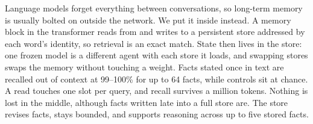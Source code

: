 \noindent Language models forget everything between conversations, so long-term memory is
usually bolted on outside the network. We put it inside instead. A memory block in the
transformer reads from and writes to a persistent store addressed by each word's identity,
so retrieval is an exact match. State then lives in the store: one frozen model is a
different agent with each store it loads, and swapping stores swaps the memory without
touching a weight. Facts stated once in text are recalled out of context at 99--100\% for
up to 64 facts, while controls sit at chance. A read touches one slot per query, and recall
survives a million tokens. Nothing is lost in the middle, although facts written late into
a full store are. The store revises facts, stays bounded, and supports reasoning across up to
five stored facts.
\par\bigskip